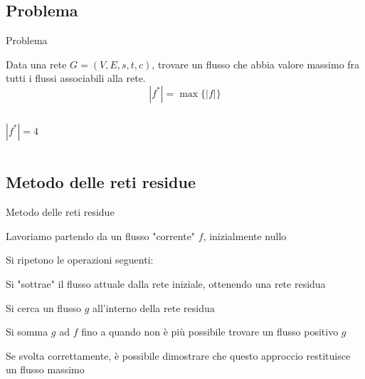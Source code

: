 \subsection{Problema}

\begin{frame}{Problema}

\vspace{-9pt}
\begin{myboxtitle}
Data una rete $G=(V,E,s,t,c)$, trovare un flusso che abbia valore massimo fra 
tutti i flussi associabili alla rete.
\[
  |f^*| = \max \{ |f| \}
\]
\end{myboxtitle}

\begin{columns}[T]
\[|f^*| = 4\]
\vspace{-12pt}
\end{columns}

\end{frame}

\subsection{Metodo delle reti residue}


\begin{frame}{Metodo delle reti residue}

\vspace{-9pt}
\BIL
\item Lavoriamo partendo da un flusso "corrente" $f$, inizialmente nullo
\item Si ripetono le operazioni seguenti:
  \BIL
  \item Si "sottrae" il flusso attuale dalla rete iniziale, ottenendo una
    rete residua
  \item Si cerca un flusso $g$ all'interno della rete residua
  \item Si somma $g$ ad $f$
  \EIL
  fino a quando non è più possibile trovare un flusso positivo $g$
\EIL

\smallskip
{}
Se svolta correttamente, è possibile dimostrare che questo approccio restituisce
un flusso massimo

\end{frame}



